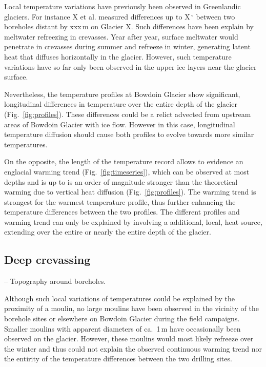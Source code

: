\documentclass[utf8]{article}
\begin{document}
    Local temperature variations have previously been observed in Greenlandic
    glaciers.  For instance X et al. measured differences up to X\,$^\circ$
    between two boreholes distant by xxx\,m on Glacier X. Such differences have
    been explain by meltwater refreezing in crevasses. Year after year, surface
    meltwater would penetrate in crevasses during summer and refreeze in
    winter, generating latent heat that diffuses horizontally in the glacier.
    However, such temperature variations have so far only been observed in the
    upper ice layers near the glacier surface.

    Nevertheless, the temperature profiles at Bowdoin Glacier show significant,
    longitudinal differences in temperature over the entire depth of the
    glacier (Fig.~\ref{fig:profiles}). These differences could be a relict
    advected from upstream areas
    of Bowdoin Glacier with ice flow. However in this case, longitudinal
    temperature diffusion should cause both profiles to evolve towards more
    similar temperatures.

    On the opposite, the length of the temperature record allows to evidence an
    englacial warming trend (Fig.~\ref{fig:timeseries}), which can be observed
    at most depths and is up to is an order of magnitude stronger than the
    theoretical warming due to vertical heat diffusion
    (Fig.~\ref{fig:profiles}). The warming trend is strongest for the warmest
    temperature profile, thus further enhancing the temperature differences
    between the two profiles. The different profiles and warming trend can only
    be explained by involving a additional, local, heat source, extending over
    the entire or nearly the entire depth of the glacier.


\subsection{Deep crevassing}

     -- Topography around boreholes.

    Although such local variations of temperatures could be explained by the
    proximity of a moulin, no large moulins have been observed in the vicinity
    of the borehole sites or elsewhere on Bowdoin Glacier during the field
    campaigns. Smaller moulins with apparent diameters of ca.~1\,m have
    occasionally been observed on the glacier. However, these moulins would
    most likely refreeze over the winter and thus could not explain the
    observed continuous warming trend nor the entirity of the temperature
    differences between the two drilling sites.
\end{document}
